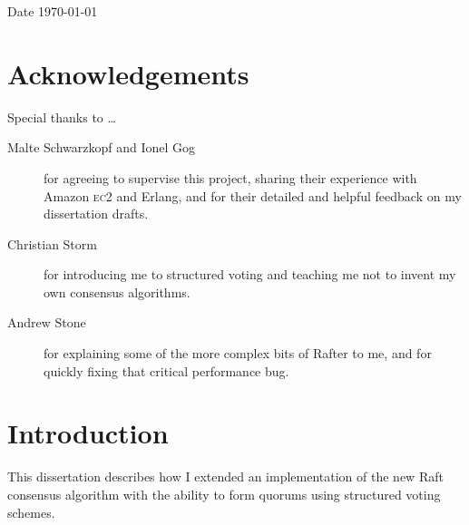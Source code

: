 \documentclass[12pt,chapterprefix=true,toc=bibliography,numbers=noendperiod,
               footnotes=multiple,twoside]{scrreprt}
\newcommand{\ECC}[0]{\textsc{ec}2 }
\begin{document}
\vspace{0.2in}
Date \hspace{0.4in} \today



\chapter*{Acknowledgements}
\label{ch:acknowledgements}

Special thanks to \dots

\begin{description}
    \item[Malte Schwarzkopf and Ionel Gog] for agreeing to supervise this project, sharing their experience with Amazon \ECC and Erlang, and for their detailed and helpful feedback on my dissertation drafts.
    \item[Christian Storm] for introducing me to structured voting and teaching me not to invent my own consensus algorithms.
    \item[Andrew Stone] for explaining some of the more complex bits of Rafter to me, and for quickly fixing that critical performance bug.
\end{description}

\tableofcontents





\chapter{Introduction}
\label{ch:introduction}


This dissertation describes how I extended an implementation of the new Raft consensus algorithm with the ability to form quorums using structured voting schemes.

\end{document}
